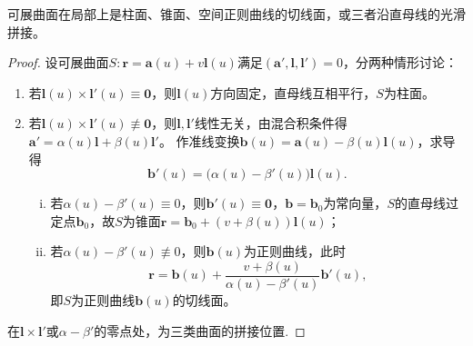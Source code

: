 \documentclass[../../main.tex]{subfiles}%
\begin{document}
\begin{theorem}
可展曲面在局部上是柱面、锥面、空间正则曲线的切线面，或三者沿直母线的光滑拼接。
\end{theorem}
\begin{proof}

设可展曲面$S:\bm r=\bm a(u)+v\bm l(u)$满足$(\bm a',\bm l,\bm l')=0$，分两种情形讨论：

\begin{enumerate}[(1)]
\item 若$\bm l(u)\times\bm l'(u)\equiv\bm 0$，则$\bm l(u)$方向固定，直母线互相平行，$S$为柱面。
\item 若$\bm l(u)\times\bm l'(u)\not\equiv\bm 0$，则$\bm l,\bm l'$线性无关，由混合积条件得$\bm a'=\alpha(u)\bm l+\beta(u)\bm l'$。
作准线变换$\bm b(u)=\bm a(u)-\beta(u)\bm l(u)$，求导得
$$\bm b'(u)=\big(\alpha(u)-\beta'(u)\big)\bm l(u).$$
\begin{enumerate}[(i)]
\item 若$\alpha(u)-\beta'(u)\equiv0$，则$\bm b'(u)\equiv\bm 0$，$\bm b=\bm b_0$为常向量，$S$的直母线过定点$\bm b_0$，故$S$为锥面$\bm r=\bm b_0+(v+\beta(u))\bm l(u)$；
\item 若$\alpha(u)-\beta'(u)\not\equiv0$，则$\bm b(u)$为正则曲线，此时
$$\bm r=\bm b(u)+\frac{v+\beta(u)}{\alpha(u)-\beta'(u)}\bm b'(u),$$
即$S$为正则曲线$\bm b(u)$的切线面。
\end{enumerate}
\end{enumerate}

在$\bm l\times\bm l'$或$\alpha-\beta'$的零点处，为三类曲面的拼接位置.

\end{proof}
\end{document}
